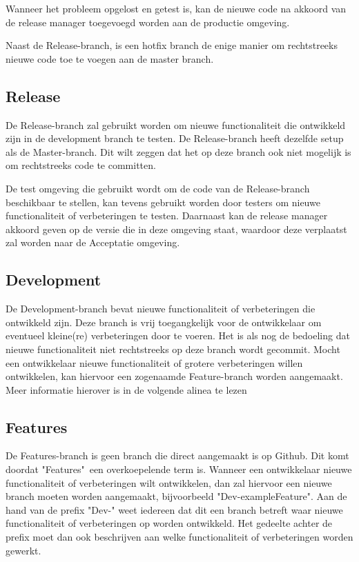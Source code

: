 	Wanneer het probleem opgelost en getest is, kan de nieuwe code na akkoord van de release manager toegevoegd worden aan de productie omgeving.
	
	Naast de Release-branch, is een hotfix branch de enige manier om rechtstreeks nieuwe code toe te voegen aan de master branch.
	
	\subsection{Release}
	De Release-branch zal gebruikt worden om nieuwe functionaliteit die ontwikkeld zijn in de development branch te testen. 
	De Release-branch heeft dezelfde setup als de Master-branch. Dit wilt zeggen dat het op deze branch ook niet mogelijk is om rechtstreeks code te committen.
	
	De test omgeving die gebruikt wordt om de code van de Release-branch beschikbaar te stellen, kan tevens gebruikt worden door testers om nieuwe functionaliteit of verbeteringen te testen. Daarnaast kan de release manager akkoord geven op de versie die in deze omgeving staat, waardoor deze verplaatst zal worden naar de Acceptatie omgeving.
	\subsection{Development}
	
	De Development-branch bevat nieuwe functionaliteit of verbeteringen die ontwikkeld zijn. Deze branch is vrij toegangkelijk voor de ontwikkelaar om eventueel kleine(re) verbeteringen door te voeren.	
	Het is als nog de bedoeling dat nieuwe functionaliteit niet rechtstreeks op deze branch wordt gecommit. Mocht een ontwikkelaar nieuwe functionaliteit of grotere verbeteringen willen ontwikkelen, kan hiervoor een zogenaamde Feature-branch worden aangemaakt. Meer informatie hierover is in de volgende alinea te lezen
	
	\subsection{Features}
	De Features-branch is geen branch die direct aangemaakt is op Github. Dit komt doordat "Features"\ een overkoepelende term is. Wanneer een ontwikkelaar nieuwe functionaliteit of verbeteringen wilt ontwikkelen, dan zal hiervoor een nieuwe branch moeten worden aangemaakt, bijvoorbeeld "Dev-exampleFeature". Aan de hand van de prefix "Dev-" weet iedereen dat dit een branch betreft waar nieuwe functionaliteit of verbeteringen op worden ontwikkeld. Het gedeelte achter de prefix moet dan ook beschrijven aan welke functionaliteit of verbeteringen worden gewerkt.
	
